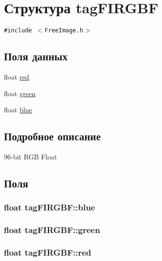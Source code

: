 \hypertarget{structtag_f_i_r_g_b_f}{
\section{Структура tagFIRGBF}
\label{structtag_f_i_r_g_b_f}
}
{\tt \#include $<$FreeImage.h$>$}

\subsection*{Поля данных}
\begin{CompactItemize}
\item 
float \hyperlink{structtag_f_i_r_g_b_f_b15fa4a5afe84d7d66e598a1c1a17ffa}{red}
\item 
float \hyperlink{structtag_f_i_r_g_b_f_c062604601e6b4da84deb02a29287774}{green}
\item 
float \hyperlink{structtag_f_i_r_g_b_f_18cf7966f5a4f5ffd0820aa5a18f8362}{blue}
\end{CompactItemize}


\subsection{Подробное описание}
96-bit RGB Float 

\subsection{Поля}
\hypertarget{structtag_f_i_r_g_b_f_18cf7966f5a4f5ffd0820aa5a18f8362}{
\subsubsection[{blue}]{\setlength{\rightskip}{0pt plus 5cm}float {\bf tagFIRGBF::blue}}}
\label{structtag_f_i_r_g_b_f_18cf7966f5a4f5ffd0820aa5a18f8362}


\hypertarget{structtag_f_i_r_g_b_f_c062604601e6b4da84deb02a29287774}{
\subsubsection[{green}]{\setlength{\rightskip}{0pt plus 5cm}float {\bf tagFIRGBF::green}}}
\label{structtag_f_i_r_g_b_f_c062604601e6b4da84deb02a29287774}


\hypertarget{structtag_f_i_r_g_b_f_b15fa4a5afe84d7d66e598a1c1a17ffa}{
\subsubsection[{red}]{\setlength{\rightskip}{0pt plus 5cm}float {\bf tagFIRGBF::red}}}
\label{structtag_f_i_r_g_b_f_b15fa4a5afe84d7d66e598a1c1a17ffa}




